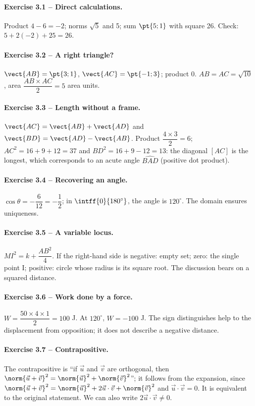 \paragraph{Exercise 3.1 -- Direct calculations.} Product $4-6=-2$; norms $\sqrt5$ and 5; sum $\pt{5;1}$ with square 26. Check: $5+2(-2)+25=26$.
\paragraph{Exercise 3.2 -- A right triangle?} $\vect{AB}=\pt{3;1}$, $\vect{AC}=\pt{-1;3}$; product 0. $AB=AC=\sqrt{10}$, area $\dfrac{AB\times AC}{2}=5$ area units.
\paragraph{Exercise 3.3 -- Length without a frame.} $\vect{AC}=\vect{AB}+\vect{AD}$ and $\vect{BD}=\vect{AD}-\vect{AB}$. Product $\dfrac{4\times 3}{2}=6$; $AC^2=16+9+12=37$ and $BD^2=16+9-12=13$: the diagonal $[AC]$ is the longest, which corresponds to an acute angle $\widehat{BAD}$ (positive dot product).
\paragraph{Exercise 3.4 -- Recovering an angle.} $\cos \theta =-\dfrac{6}{12}=-\dfrac{1}{2}$; in $\intff{0}{180^\circ}$, the angle is $120^\circ$. The domain ensures uniqueness.
\paragraph{Exercise 3.5 -- A variable locus.} $MI^2=k+\dfrac{AB^2}{4}$. If the right-hand side is negative: empty set; zero: the single point I; positive: circle whose radius is its square root. The discussion bears on a squared distance.
\paragraph{Exercise 3.6 -- Work done by a force.} $W=\dfrac{50\times 4\times 1}{2}=100$ J. At $120^\circ$, $W=-100$ J. The sign distinguishes help to the displacement from opposition; it does not describe a negative distance.
\paragraph{Exercise 3.7 -- Contrapositive.} The contrapositive is ``if $\vec u$ and $\vec v$ are orthogonal, then $\norm{\vec u+\vec v}^2=\norm{\vec u}^2+\norm{\vec v}^2$''; it follows from the expansion, since $\norm{\vec u+\vec v}^2=\norm{\vec u}^2+2\vec u\cdot\vec v+\norm{\vec v}^2$ and $\vec u\cdot\vec v=0$. It is equivalent to the original statement. We can also write $2\vec u\cdot\vec v\ne0$.
